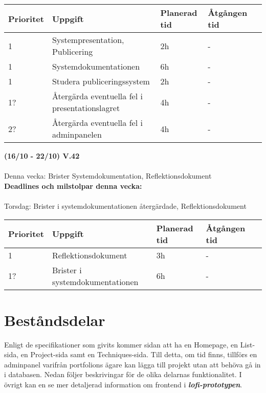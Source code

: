 \documentclass{TDP003mall}
\begin{document}
\begin{table}
\begin{tabular}{|l|l|l|l|l|}
\hline
 Prioritet & Uppgift                    & Planerad tid & Åtgången tid \\ \hline
 1        & Systempresentation, Publicering        & 2h            & -       \\ \hline
 1         & Systemdokumentationen  & 6h          & -          \\ \hline
 1         & Studera publiceringssystem & 2h           & -       \\ \hline
 1?        & Återgärda eventuella fel i presentationslagret           & 4h            & -       \\ \hline
 2?        & Återgärda eventuella fel i adminpanelen         & 4h            & -       \\ \hline
\end{tabular}
\end{table}

\hrulefill
\pagebreak

\textbf{(16/10 - 22/10) V.42}\\\\
Denna vecka: Brister Systemdokumentation, Reflektionsdokument\\

\textbf{Deadlines och milstolpar denna vecka: }\\\\
Torsdag: Brister i systemdokumentationen återgärdade, Reflektionsdokument



\begin{table}[]
\begin{tabular}{|l|l|l|l|l|}
\hline
 Prioritet & Uppgift                    & Planerad tid & Åtgången tid \\ \hline
 1         & Reflektionsdokument & 3h          & -          \\ \hline
 1?         & Brister i systemdokumentationen & 6h          & -          \\ \hline

\end{tabular}
\end{table}

\hrulefill

\pagebreak

\section{Beståndsdelar}
Enligt de specifikationer som givits kommer sidan att ha en Homepage, en List-sida, 
en Project-sida samt en Techniques-sida. Till detta, om tid finns, tillförs en
adminpanel varifrån portfolions ägare kan lägga till projekt utan att behöva gå in i
databasen. Nedan följer beskrivingar för de olika delarnas funktionalitet. I övrigt kan
en se mer detaljerad information om frontend i \textbf{\textit{lofi-prototypen}}.
\end{document}
